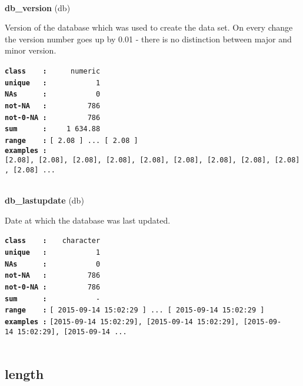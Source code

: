 \documentclass[]{article}
\begin{document}
~

\textbf{db\_version} (db)

Version of the database which was used to create the data set. On every
change the version number goes up by 0.01 - there is no distinction
between major and minor version.

\textbf{\texttt{class\ \ \ \ :}} \texttt{~~~~~numeric}\\
\textbf{\texttt{unique\ \ \ :}} \texttt{~~~~~~~~~~~1}\\
\textbf{\texttt{NAs\ \ \ \ \ \ :}} \texttt{~~~~~~~~~~~0}\\
\textbf{\texttt{not-NA\ \ \ :}} \texttt{~~~~~~~~~786}\\
\textbf{\texttt{not-0-NA\ :}} \texttt{~~~~~~~~~786}\\
\textbf{\texttt{sum\ \ \ \ \ \ :}} \texttt{~~~~1~634.88}\\
\textbf{\texttt{range\ \ \ \ :}}
\texttt{{[}\ 2.08\ {]}\ ...\ {[}\ 2.08\ {]}}\\
\textbf{\texttt{examples\ :}}
\texttt{{[}2.08{]},\ {[}2.08{]},\ {[}2.08{]},\ {[}2.08{]},\ {[}2.08{]},\ {[}2.08{]},\ {[}2.08{]},\ {[}2.08{]},\ {[}2.08{]},\ {[}2.08{]}\ ...}\\

~

\textbf{db\_lastupdate} (db)

Date at which the database was last updated.

\textbf{\texttt{class\ \ \ \ :}} \texttt{~~~character}\\
\textbf{\texttt{unique\ \ \ :}} \texttt{~~~~~~~~~~~1}\\
\textbf{\texttt{NAs\ \ \ \ \ \ :}} \texttt{~~~~~~~~~~~0}\\
\textbf{\texttt{not-NA\ \ \ :}} \texttt{~~~~~~~~~786}\\
\textbf{\texttt{not-0-NA\ :}} \texttt{~~~~~~~~~786}\\
\textbf{\texttt{sum\ \ \ \ \ \ :}} \texttt{~~~~~~~~~~~-}\\
\textbf{\texttt{range\ \ \ \ :}}
\texttt{{[}\ 2015-09-14\ 15:02:29\ {]}\ ...\ {[}\ 2015-09-14\ 15:02:29\ {]}}\\
\textbf{\texttt{examples\ :}}
\texttt{{[}2015-09-14\ 15:02:29{]},\ {[}2015-09-14\ 15:02:29{]},\ {[}2015-09-14\ 15:02:29{]},\ {[}2015-09-14\ ...}\\

~

\subsection{length}\label{length}
\end{document}
